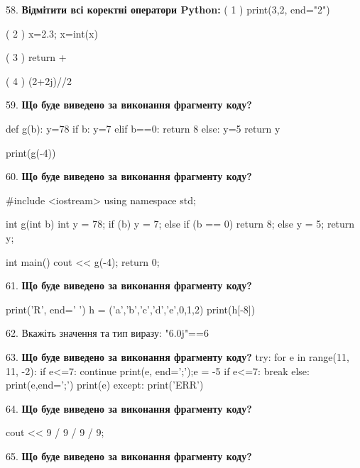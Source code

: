 \documentclass[11pt]{article}
\begin{document}
\par\vspace{5mm}
58. %
\textbf{Відмітити всі коректні оператори Python:}
( 1 ) print(3,2, end="2")

( 2 ) x=2.3; x=int(x)

( 3 ) return +

( 4 ) (2+2j)//2
\par\vspace{5mm}
59. \textbf{Що буде виведено за виконання фрагменту коду?}

def g(b):
    y=78
    if b: 
        y=7
    elif b==0:
         return 8
    else:
         y=5
    return y

print(g(-4))
\par\vspace{5mm}
60. \textbf{Що буде виведено за виконання фрагменту коду?}

#include <iostream>
using namespace std;

int g(int b){
    int y = 78;
    if (b) 
        y = 7;
    else if (b == 0)
         return 8;
    else
         y = 5;
    return y;
}

int main(){
    cout << g(-4);
    return 0;
}

\par\vspace{5mm}
61. \textbf{Що буде виведено за виконання фрагменту коду?}

print('R', end=' ')
h = ('a','b','c','d','e',0,1,2)
print(h[-8])

\par\vspace{5mm}
62. 
Вкажіть значення та тип виразу:
"6.0j"==6
\par\vspace{5mm}
63. \textbf{Що буде виведено за виконання фрагменту коду?}
try:
    for e in range(11, 11, -2):
        if e<=7:
            continue
        print(e, end=';');e = -5
        if e<=7:
            break
    else:
        print(e,end=';')
    print(e)
except:
    print('ERR')
\par\vspace{5mm}
64. \textbf{Що буде виведено за виконання фрагменту коду?}

cout << 9 / 9 / 9 / 9;
\par\vspace{5mm}
65. \textbf{Що буде виведено за виконання фрагменту коду?}
\end{document}
